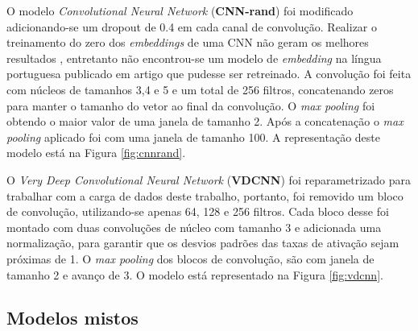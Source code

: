 O modelo \textit{Convolutional Neural Network} (\textbf{CNN-rand}) \cite{kim_convolutional_2014} foi modificado adicionando-se um
dropout de 0.4 em cada canal de convolução. Realizar o treinamento do zero dos \textit{embeddings} de uma CNN não geram os melhores resultados \cite{kim_convolutional_2014}, entretanto não encontrou-se um modelo de \textit{embedding} na língua portuguesa publicado em artigo que pudesse ser retreinado. A convolução foi feita com núcleos de
tamanhos 3,4 e 5 e um total de 256 filtros, concatenando zeros para manter o tamanho do
vetor ao final da convolução. O \textit{max pooling} foi obtendo o maior valor
de uma janela de tamanho 2. Após a concatenação o \textit{max pooling} aplicado
foi com uma janela de tamanho 100. A representação deste modelo está na Figura
\ref{fig:cnnrand}.

O \textit{Very Deep Convolutional Neural Network} (\textbf{VDCNN}) \cite{conneau_very_2017} foi reparametrizado para trabalhar com a carga de dados deste trabalho,
portanto, foi removido um bloco de convolução, utilizando-se apenas 64, 128 e
256 filtros. Cada bloco desse foi montado com duas convoluções de núcleo com
tamanho 3 e adicionada uma normalização, para garantir que os desvios padrões das taxas de ativação
sejam próximas de 1. O \textit{max pooling} dos blocos de convolução, são com
janela de tamanho 2 e avanço de 3. O modelo está representado na Figura
\ref{fig:vdcnn}.



\subsection{Modelos mistos}

